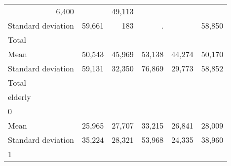\begin{tabular}{llllll}
  \multicolumn{1}{r}{6,400} &
  \multicolumn{1}{r}{} &
  \multicolumn{1}{r}{49,113} \\
\multicolumn{1}{l}{\hspace{4em}Standard deviation} &
  \multicolumn{1}{|r}{59,661} &
  \multicolumn{1}{r}{183} &
  \multicolumn{1}{r}{.} &
  \multicolumn{1}{r}{} &
  \multicolumn{1}{r}{58,850} \\
\multicolumn{1}{l}{\hspace{3em}Total} &
  \multicolumn{1}{|r}{} &
  \multicolumn{1}{r}{} &
  \multicolumn{1}{r}{} &
  \multicolumn{1}{r}{} &
  \multicolumn{1}{r}{} \\
\multicolumn{1}{l}{\hspace{4em}Mean} &
  \multicolumn{1}{|r}{50,543} &
  \multicolumn{1}{r}{45,969} &
  \multicolumn{1}{r}{53,138} &
  \multicolumn{1}{r}{44,274} &
  \multicolumn{1}{r}{50,170} \\
\multicolumn{1}{l}{\hspace{4em}Standard deviation} &
  \multicolumn{1}{|r}{59,131} &
  \multicolumn{1}{r}{32,350} &
  \multicolumn{1}{r}{76,869} &
  \multicolumn{1}{r}{29,773} &
  \multicolumn{1}{r}{58,852} \\
\multicolumn{1}{l}{\hspace{1em}Total} &
  \multicolumn{1}{|r}{} &
  \multicolumn{1}{r}{} &
  \multicolumn{1}{r}{} &
  \multicolumn{1}{r}{} &
  \multicolumn{1}{r}{} \\
\multicolumn{1}{l}{\hspace{2em}elderly} &
  \multicolumn{1}{|r}{} &
  \multicolumn{1}{r}{} &
  \multicolumn{1}{r}{} &
  \multicolumn{1}{r}{} &
  \multicolumn{1}{r}{} \\
\multicolumn{1}{l}{\hspace{3em}0} &
  \multicolumn{1}{|r}{} &
  \multicolumn{1}{r}{} &
  \multicolumn{1}{r}{} &
  \multicolumn{1}{r}{} &
  \multicolumn{1}{r}{} \\
\multicolumn{1}{l}{\hspace{4em}Mean} &
  \multicolumn{1}{|r}{25,965} &
  \multicolumn{1}{r}{27,707} &
  \multicolumn{1}{r}{33,215} &
  \multicolumn{1}{r}{26,841} &
  \multicolumn{1}{r}{28,009} \\
\multicolumn{1}{l}{\hspace{4em}Standard deviation} &
  \multicolumn{1}{|r}{35,224} &
  \multicolumn{1}{r}{28,321} &
  \multicolumn{1}{r}{53,968} &
  \multicolumn{1}{r}{24,335} &
  \multicolumn{1}{r}{38,960} \\
\multicolumn{1}{l}{\hspace{3em}1} &
  \multicolumn{1}{|r}{} &

\end{tabular}
